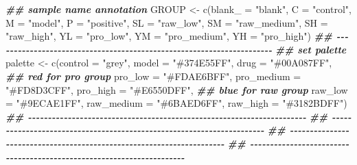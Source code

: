 \documentclass[
]{article}
\newenvironment{Shaded}{\begin{snugshade}}{\end{snugshade}}
\newcommand{\AttributeTok}[1]{\textcolor[rgb]{0.77,0.63,0.00}{#1}}
\newcommand{\DocumentationTok}[1]{\textcolor[rgb]{0.56,0.35,0.01}{\textbf{\textit{#1}}}}
\newcommand{\FunctionTok}[1]{\textcolor[rgb]{0.00,0.00,0.00}{#1}}
\newcommand{\NormalTok}[1]{#1}
\newcommand{\OtherTok}[1]{\textcolor[rgb]{0.56,0.35,0.01}{#1}}
\newcommand{\StringTok}[1]{\textcolor[rgb]{0.31,0.60,0.02}{#1}}
\begin{document}
\begin{Shaded}
\begin{Highlighting}[]
\DocumentationTok{\#\# sample name annotation}
\NormalTok{GROUP }\OtherTok{\textless{}{-}} \FunctionTok{c}\NormalTok{(}\AttributeTok{blank\_ =} \StringTok{"blank"}\NormalTok{, }\AttributeTok{C =} \StringTok{"control"}\NormalTok{, }\AttributeTok{M =} \StringTok{"model"}\NormalTok{, }\AttributeTok{P =} \StringTok{"positive"}\NormalTok{,}
           \AttributeTok{SL =} \StringTok{"raw\_low"}\NormalTok{, }\AttributeTok{SM =} \StringTok{"raw\_medium"}\NormalTok{, }\AttributeTok{SH =} \StringTok{"raw\_high"}\NormalTok{,}
           \AttributeTok{YL =} \StringTok{"pro\_low"}\NormalTok{, }\AttributeTok{YM =} \StringTok{"pro\_medium"}\NormalTok{, }\AttributeTok{YH =} \StringTok{"pro\_high"}\NormalTok{)}
\DocumentationTok{\#\# {-}{-}{-}{-}{-}{-}{-}{-}{-}{-}{-}{-}{-}{-}{-}{-}{-}{-}{-}{-}{-}{-}{-}{-}{-}{-}{-}{-}{-}{-}{-}{-}{-}{-}{-}{-}{-}{-}{-}{-}{-}{-}{-}{-}{-}{-}{-}{-}{-}{-}{-}{-}{-}{-}{-}{-}{-}{-}{-}{-}{-}{-}{-}{-}{-}{-}{-}{-}{-}{-} }
\DocumentationTok{\#\# set palette}
\NormalTok{palette }\OtherTok{\textless{}{-}} \FunctionTok{c}\NormalTok{(}\AttributeTok{control =} \StringTok{"grey"}\NormalTok{, }\AttributeTok{model =} \StringTok{"\#374E55FF"}\NormalTok{, }\AttributeTok{drug =} \StringTok{"\#00A087FF"}\NormalTok{,}
             \DocumentationTok{\#\# red for pro group}
             \AttributeTok{pro\_low =} \StringTok{"\#FDAE6BFF"}\NormalTok{, }\AttributeTok{pro\_medium =} \StringTok{"\#FD8D3CFF"}\NormalTok{, }\AttributeTok{pro\_high =} \StringTok{"\#E6550DFF"}\NormalTok{,}
             \DocumentationTok{\#\# blue for raw group}
             \AttributeTok{raw\_low =} \StringTok{"\#9ECAE1FF"}\NormalTok{, }\AttributeTok{raw\_medium =} \StringTok{"\#6BAED6FF"}\NormalTok{, }\AttributeTok{raw\_high =} \StringTok{"\#3182BDFF"}\NormalTok{)}
\DocumentationTok{\#\# {-}{-}{-}{-}{-}{-}{-}{-}{-}{-}{-}{-}{-}{-}{-}{-}{-}{-}{-}{-}{-}{-}{-}{-}{-}{-}{-}{-}{-}{-}{-}{-}{-}{-}{-}{-}{-}{-}{-}{-}{-}{-}{-}{-}{-}{-}{-}{-}{-}{-}{-}{-}{-}{-}{-}{-}{-}{-}{-}{-}{-}{-}{-}{-}{-}{-}{-}{-}{-}{-} }
\DocumentationTok{\#\# {-}{-}{-}{-}{-}{-}{-}{-}{-}{-}{-}{-}{-}{-}{-}{-}{-}{-}{-}{-}{-}{-}{-}{-}{-}{-}{-}{-}{-}{-}{-}{-}{-}{-}{-}{-}{-}{-}{-}{-}{-}{-}{-}{-}{-}{-}{-}{-}{-}{-}{-}{-}{-}{-}{-}{-}{-}{-}{-}{-}{-}{-}{-}{-}{-}{-}{-}{-}{-}{-} }
\DocumentationTok{\#\# {-}{-}{-}{-}{-}{-}{-}{-}{-}{-}{-}{-}{-}{-}{-}{-}{-}{-}{-}{-}{-}{-}{-}{-}{-}{-}{-}{-}{-}{-}{-}{-}{-}{-}{-}{-}{-}{-}{-}{-}{-}{-}{-}{-}{-}{-}{-}{-}{-}{-}{-}{-}{-}{-}{-}{-}{-}{-}{-}{-}{-}{-}{-}{-}{-}{-}{-}{-}{-}{-} }
\DocumentationTok{\#\# {-}{-}{-}{-}{-}{-}{-}{-}{-}{-}{-}{-}{-}{-}{-}{-}{-}{-}{-}{-}{-}{-}{-}{-}{-}{-}{-}{-}{-}{-}{-}{-}{-}{-}{-}{-}{-}{-}{-}{-}{-}{-}{-}{-}{-}{-}{-}{-}{-}{-}{-}{-}{-}{-}{-}{-}{-}{-}{-}{-}{-}{-}{-}{-}{-}{-}{-}{-}{-}{-} }

\end{Highlighting}
\end{Shaded}
\end{document}
